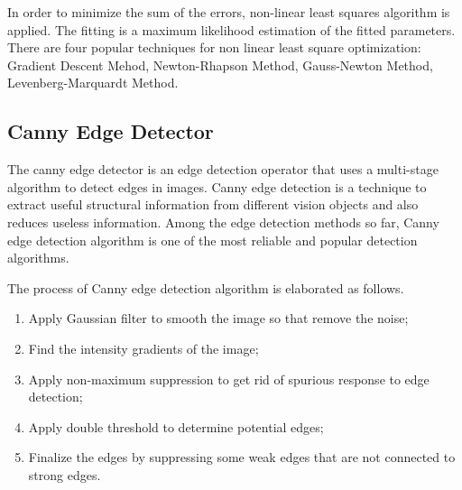 \documentclass[paper=a4, fontsize=14pt]{scrartcl}
\numberwithin{equation}{section}		%
\numberwithin{figure}{section}			%
\numberwithin{table}{section}				%
\begin{document}
In order to minimize the sum of the errors, non-linear least squares algorithm\cite{gill1978algorithms} is applied. The fitting is a maximum likelihood estimation of the fitted parameters. There are four popular techniques for non linear least square optimization: Gradient Descent Mehod, Newton-Rhapson Method, Gauss-Newton Method, Levenberg-Marquardt Method.

\subsection{Canny Edge Detector}
The canny edge detector\cite{canny1986computational} is an edge detection operator that uses a multi-stage algorithm to detect edges in images.
Canny edge detection is a technique to extract useful structural information from different vision objects and also reduces useless information.
Among the edge detection methods so far, Canny edge detection algorithm is one of the most reliable and popular detection algorithms.

The process of Canny edge detection algorithm is elaborated as follows\cite{moeslund2009canny}.
\begin{enumerate}
    \item Apply Gaussian filter to smooth the image so that remove the noise;
    \item Find the intensity gradients of the image;
    \item Apply non-maximum suppression to get rid of spurious response to edge detection;
    \item Apply double threshold to determine potential edges;
    \item Finalize the edges by suppressing some weak edges that are not connected to strong edges.
\end{enumerate}
\end{document}
